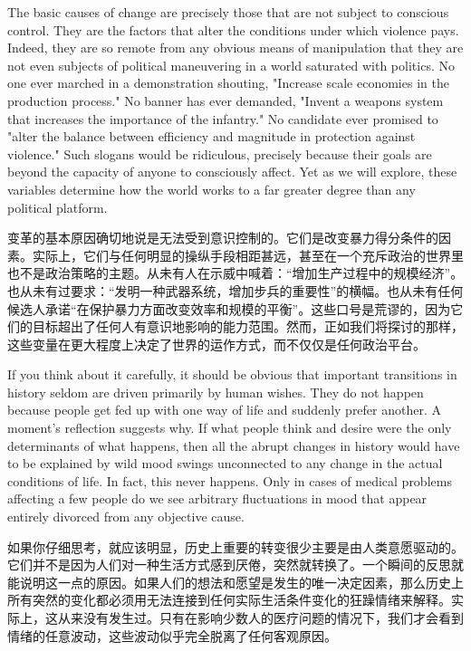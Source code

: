 \begin{Parallel}{97mm}{45mm}
  \ParallelLText
  {The basic causes of change are precisely those that are not subject to conscious control. They are the factors that alter the conditions under which violence pays. Indeed, they are so remote from any obvious means of manipulation that they are not even subjects of political maneuvering in a world saturated with politics. No one ever marched in a demonstration shouting, "Increase scale economies in the production process." No banner has ever demanded, "Invent a weapons system that increases the importance of the infantry." No candidate ever promised to "alter the balance between efficiency and magnitude in protection against violence." Such slogans would be ridiculous, precisely because their goals are beyond the capacity of anyone to consciously affect. Yet as we will explore, these variables determine how the world works to a far greater degree than any political platform.}
  
  \ParallelRText
  {变革的基本原因确切地说是无法受到意识控制的。它们是改变暴力得分条件的因素。实际上，它们与任何明显的操纵手段相距甚远，甚至在一个充斥政治的世界里也不是政治策略的主题。从未有人在示威中喊着：“增加生产过程中的规模经济”。也从未有过要求：“发明一种武器系统，增加步兵的重要性”的横幅。也从未有任何候选人承诺“在保护暴力方面改变效率和规模的平衡”。这些口号是荒谬的，因为它们的目标超出了任何人有意识地影响的能力范围。然而，正如我们将探讨的那样，这些变量在更大程度上决定了世界的运作方式，而不仅仅是任何政治平台。}
  \ParallelPar



  \ParallelLText
  {If you think about it carefully, it should be obvious that important transitions in history seldom are driven primarily by human wishes. They do not happen because people get fed up with one way of life and suddenly prefer another. A moment's reflection suggests why. If what people think and desire were the only determinants of what happens, then all the abrupt changes in history would have to be explained by wild mood swings unconnected to any change in the actual conditions of life. In fact, this never happens. Only in cases of medical problems affecting a few people do we see arbitrary fluctuations in mood that appear entirely divorced from any objective cause.}
  
  \ParallelRText
  {如果你仔细思考，就应该明显，历史上重要的转变很少主要是由人类意愿驱动的。它们并不是因为人们对一种生活方式感到厌倦，突然就转换了。一个瞬间的反思就能说明这一点的原因。如果人们的想法和愿望是发生的唯一决定因素，那么历史上所有突然的变化都必须用无法连接到任何实际生活条件变化的狂躁情绪来解释。实际上，这从来没有发生过。只有在影响少数人的医疗问题的情况下，我们才会看到情绪的任意波动，这些波动似乎完全脱离了任何客观原因。}
  \ParallelPar




\end{Parallel}
